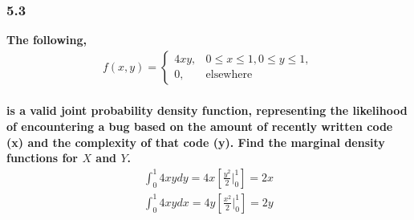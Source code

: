 \documentclass[
	a4paper, %
	10pt, %
	unnumberedsections, %
	twoside, %
]{LTJournalArticle}
\begin{document}
\subsubsection{5.3}
\textbf{The following,}
\begin{equation*}
    \begin{aligned}
        f(x, y) =
        \begin{cases}
            4xy, & 0 \le x \le 1, 0 \le y \le 1, \\
            0, & \text{elsewhere}
        \end{cases}
    \end{aligned}
\end{equation*} \\
\textbf{is a valid joint probability density function, representing the likelihood of encountering a bug based on the amount of recently written code (x) and the complexity of that code (y). Find the marginal density functions for $X$ and $Y$.}
\begin{equation*}
    \begin{aligned}
        \int_0^1 4xy dy = 4x \left[ \frac{y^2}{2} \Biggr|_0^1 \right] = 2x \\
        \int_0^1 4xy dx = 4y \left[ \frac{x^2}{2} \Biggr|_0^1 \right] = 2y
    \end{aligned}
\end{equation*} \\
\vspace*{1pt}\noindent
\end{document}
